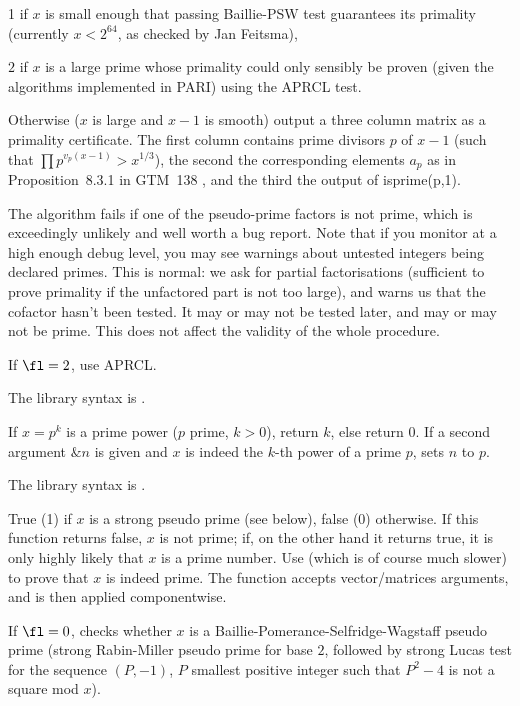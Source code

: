 \item 1 if $x$ is small enough that passing Baillie-PSW test guarantees
its primality (currently $x < 2^{64}$, as checked by Jan Feitsma),

\item $2$ if $x$ is a large prime whose primality could only sensibly be
proven (given the algorithms implemented in PARI) using the APRCL test.

\item Otherwise ($x$ is large and $x-1$ is smooth) output a three column
matrix as a primality certificate. The first column contains prime
divisors $p$ of $x-1$ (such that $\prod p^{v_p(x-1)} > x^{1/3}$), the second
the corresponding elements $a_p$ as in Proposition~8.3.1 in GTM~138 , and the
third the output of isprime(p,1).

The algorithm fails if one of the pseudo-prime factors is not prime, which is
exceedingly unlikely and well worth a bug report. Note that if you monitor
 at a high enough debug level, you may see warnings about
untested integers being declared primes. This is normal: we ask for partial
factorisations (sufficient to prove primality if the unfactored part is not
too large), and  warns us that the cofactor hasn't been tested.
It may or may not be tested later, and may or may not be prime. This does
not affect the validity of the whole  procedure.

If $\fl=2$, use APRCL.

The library syntax is .

\label{se:isprimepower}
If $x = p^k$ is a prime power ($p$ prime, $k > 0$), return $k$, else
return 0. If a second argument $\&n$ is given and $x$ is indeed
the $k$-th power of a prime $p$, sets $n$ to $p$.

The library syntax is .

\label{se:ispseudoprime}
True (1) if $x$ is a strong pseudo
prime (see below), false (0) otherwise. If this function returns false, $x$
is not prime; if, on the other hand it returns true, it is only highly likely
that $x$ is a prime number. Use  (which is of course much
slower) to prove that $x$ is indeed prime.
The function accepts vector/matrices arguments, and is then applied
componentwise.

If $\fl = 0$, checks whether $x$ is a Baillie-Pomerance-Selfridge-Wagstaff
pseudo prime (strong Rabin-Miller pseudo prime for base $2$, followed by
strong Lucas test for the sequence $(P,-1)$, $P$ smallest positive integer
such that $P^2 - 4$ is not a square mod $x$).

